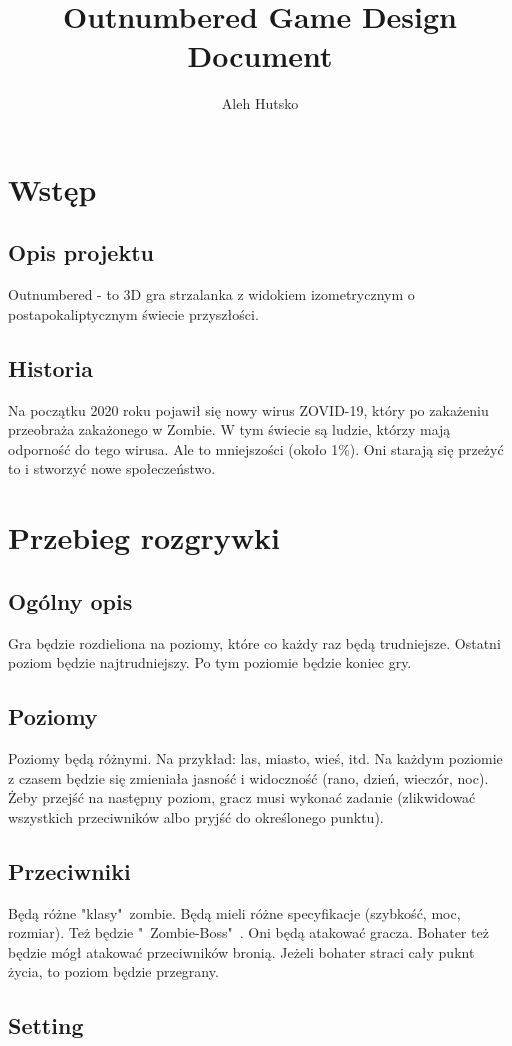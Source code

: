 \documentclass[letterpaper,12pt]{report}
\author{Aleh Hutsko}
\title{Outnumbered Game Design Document}
\date{}
\begin{document}
	\maketitle
	\clearpage
	\tableofcontents
	\clearpage
	\chapter{Wstęp}
	\section{Opis projektu}
	
	Outnumbered - to 3D gra strzalanka z widokiem
	izometrycznym o postapokaliptycznym świecie przyszłości.
	
	\section{Historia}
	
	Na początku 2020 roku pojawił się nowy wirus ZOVID-19,
	który po zakażeniu przeobraża zakażonego w Zombie. W tym
	świecie są ludzie, którzy mają odporność do tego wirusa.
	Ale to mniejszości (około 1\%). Oni starają się przeżyć to
	i stworzyć nowe społeczeństwo.
	
	
	\chapter{Przebieg rozgrywki}
	
	\section{Ogólny opis}
	
	Gra będzie rozdieliona na poziomy, które co każdy raz będą
	trudniejsze. Ostatni poziom będzie najtrudniejszy. Po tym 
	poziomie będzie koniec gry. 
	
	\section{Poziomy}
	
	Poziomy będą różnymi. Na przykład: las, miasto, wieś, itd.
	Na każdym poziomie z czasem będzie się zmieniała jasność i
	widoczność (rano, dzień, wieczór, noc). Żeby przejść na 
	następny poziom, gracz musi wykonać zadanie (zlikwidować wszystkich
	przeciwników albo pryjść do określonego punktu).  
	
	\section{Przeciwniki}
	
	Będą różne "klasy"\ zombie. Będą mieli różne specyfikacje 
	(szybkość, moc, rozmiar). Też będzie "\ Zombie-Boss"\ .
	Oni będą atakować gracza. Bohater też będzie mógł atakować
	przeciwników bronią. Jeżeli bohater straci cały puknt
	życia, to poziom będzie przegrany. 
	
	\section{Setting}
\end{document}
